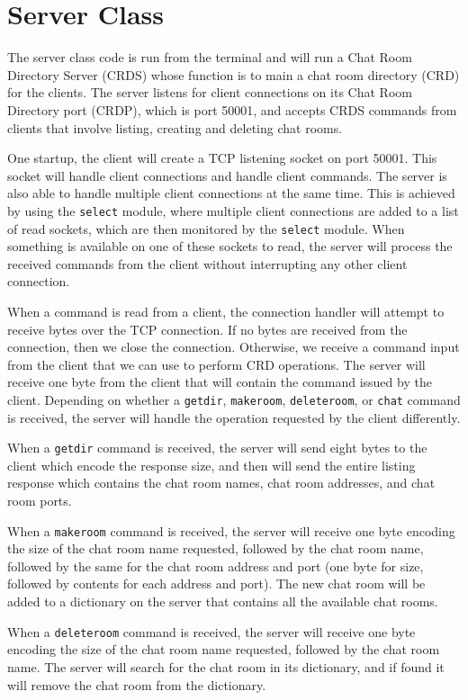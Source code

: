 \section*{Server Class}
The server class code is run from the terminal and will run a Chat Room Directory Server (CRDS) whose function is to main a chat room directory (CRD) for the clients. The server listens for client connections on its Chat Room Directory port (CRDP), which is port 50001, and accepts CRDS commands from clients that involve listing, creating and deleting chat rooms.

One startup, the client will create a TCP listening socket on port 50001. This socket will handle client connections and handle client commands. The server is also able to handle multiple client connections at the same time. This is achieved by using the \texttt{select} module, where multiple client connections are added to a list of read sockets, which are then monitored by the \texttt{select} module. When something is available on one of these sockets to read, the server will process the received commands from the client without interrupting any other client connection.

When a command is read from a client, the connection handler will attempt to receive bytes over the TCP connection. If no bytes are received from the connection, then we close the connection. Otherwise, we receive a command input from the client that we can use to perform CRD operations. The server will receive one byte from the client that will contain the command issued by the client. Depending on whether a \texttt{getdir}, \texttt{makeroom}, \texttt{deleteroom}, or \texttt{chat} command is received, the server will handle the operation requested by the client differently.

When a \texttt{getdir} command is received, the server will send eight bytes to the client which encode the response size, and then will send the entire listing response which contains the chat room names, chat room addresses, and chat room ports.

When a \texttt{makeroom} command is received, the server will receive one byte encoding the size of the chat room name requested, followed by the chat room name, followed by the same for the chat room address and port (one byte for size, followed by contents for each address and port). The new chat room will be added to a dictionary on the server that contains all the available chat rooms.

When a \texttt{deleteroom} command is received, the server will receive one byte encoding the size of the chat room name requested, followed by the chat room name. The server will search for the chat room in its dictionary, and if found it will remove the chat room from the dictionary.

